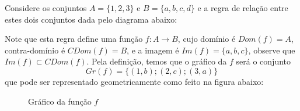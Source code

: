 \begin{exem}
 Considere os conjuntos $A= \{1, 2, 3\}$ e $B= \{a, b, c, d\}$ e a regra de relação entre estes dois conjuntos dada pelo diagrama abaixo:

 \begin{figure}[H]
 \centering
\end{figure}

Note que esta regra define uma função $f: A \rightarrow B$, cujo domínio é $Dom(f) = A$, contra-domínio é $CDom(f) = B$, e a imagem é $Im(f)= \{a, b, c\}$, observe que $Im(f) \subset CDom(f)$. Pela definição, temos que o gráfico da $f$ será o conjunto
\[
Gr(f)= \{(1, b); (2, c); (3, a)\}
\]
que pode ser representado geometricamente como feito na figura abaixo:

\begin{figure}[H]
 \centering
    \caption{Gráfico da função $f$}
  \end{figure}

\end{exem}


